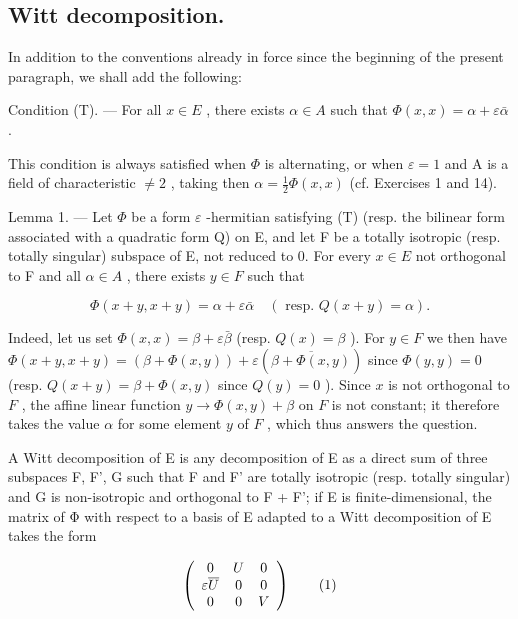 \subsection{Witt decomposition.}

In addition to the conventions already in force since the beginning of the present paragraph, we shall add the following:

Condition (T). --- For all \(x \in E\) , there exists \(\alpha \in A\) such that \(\Phi(x, x) = \alpha + \varepsilon\bar{\alpha}\) .

This condition is always satisfied when \(\Phi\) is alternating, or when \(\varepsilon = 1\) and A is a field of characteristic \(\neq 2\) , taking then \(\alpha = \frac{1}{2}\Phi(x, x)\) (cf. Exercises 1 and 14).

Lemma 1. --- Let \(\Phi\) be a form \(\varepsilon\) -hermitian satisfying (T) (resp. the bilinear form associated with a quadratic form Q) on E, and let F be a totally isotropic (resp. totally singular) subspace of E, not reduced to 0. For every \(x \in E\) not orthogonal to F and all \(\alpha \in A\) , there exists \(y \in F\) such that

\[
\Phi (x + y, x + y) = \alpha + \varepsilon \bar {\alpha} \quad (\text { resp. } Q (x + y) = \alpha).
\]

Indeed, let us set \(\Phi(x, x) = \beta + \varepsilon\bar{\beta}\) (resp. \(Q(x) = \beta\) ). For \(y \in F\) we then have \(\Phi(x + y, x + y) = (\beta + \Phi(x, y)) + \varepsilon(\overline{\beta + \Phi(x, y)})\) since \(\Phi(y, y) = 0\) (resp. \(Q(x + y) = \beta + \Phi(x, y)\) since \(Q(y) = 0\) ). Since \(x\) is not orthogonal to \(F\) , the affine linear function \(y \to \Phi(x, y) + \beta\) on \(F\) is not constant; it therefore takes the value \(\alpha\) for some element \(y\) of \(F\) , which thus answers the question.

A Witt decomposition of E is any decomposition of E as a direct sum of three subspaces F, F', G such that F and F' are totally isotropic (resp. totally singular) and G is non-isotropic and orthogonal to F + F'; if E is finite-dimensional, the matrix of Φ with respect to a basis of E adapted to a Witt decomposition of E takes the form

\[
\left( \begin{array}{c c c} 0 & U & 0 \\ \varepsilon \overline {{U}} & 0 & 0 \\ 0 & 0 & V \end{array} \right)\tag{1}
\]

